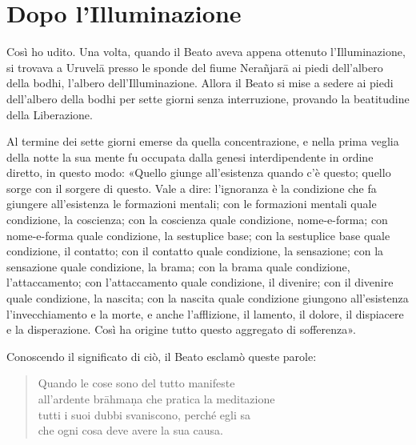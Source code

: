 \chapter{Dopo l’Illuminazione}

 Così ho udito. Una volta, quando il Beato aveva appena
ottenuto l’Illuminazione, si trovava a Uruvelā presso le sponde del fiume
Nerañjarā ai piedi dell’albero della bodhi, l’albero dell’Illuminazione. Allora
il Beato si mise a sedere ai piedi dell’albero della bodhi per sette giorni
senza interruzione, provando la beatitudine della Liberazione.

Al termine dei sette giorni emerse da quella concentrazione, e nella prima
veglia della notte la sua mente fu occupata dalla genesi interdipendente in
ordine diretto, in questo modo: «Quello giunge all’esistenza quando c’è questo;
quello sorge con il sorgere di questo. Vale a dire: l’ignoranza è la condizione
che fa giungere all’esistenza le formazioni mentali; con le formazioni mentali
quale condizione, la coscienza; con la coscienza quale condizione, nome-e-forma;
con nome-e-forma quale condizione, la sestuplice base; con la sestuplice base
quale condizione, il contatto; con il contatto quale condizione, la sensazione;
con la sensazione quale condizione, la brama; con la brama quale condizione,
l’attaccamento; con l’attaccamento quale condizione, il divenire; con il
divenire quale condizione, la nascita; con la nascita quale condizione giungono
all’esistenza l’invecchiamento e la morte, e anche l’afflizione, il lamento, il
dolore, il dispiacere e la disperazione. Così ha origine tutto questo aggregato
di sofferenza».

Conoscendo il significato di ciò, il Beato esclamò queste parole:

\begin{quote}
  Quando le cose sono del tutto manifeste \\
  all’ardente brāhmaṇa
  che pratica la meditazione \\
  tutti i suoi dubbi svaniscono, perché egli sa \\
  che ogni cosa deve avere la sua causa.
\end{quote}

